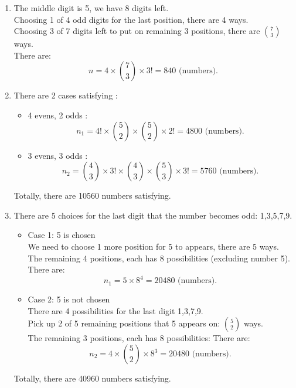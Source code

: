\documentclass[a4paper]{article}
\begin{document}
	\begin{enumerate}
	    \item The middle digit is 5, we have 8 digits left.\\
	    Choosing 1 of 4 odd digits for the last position, there are 4 ways. \\
	    Choosing 3 of 7 digits left to put on remaining 3 positions, there are $7\choose3$ ways. \\
	    There are:
	    \begin{equation*}
	        n = 4 \times {7 \choose 3} \times 3! =  840  \text{ (numbers). }
	    \end{equation*}
	    \item There are 2 cases satisfying :
	    \begin{itemize}
	        \item 4 evens, 2 odds :
	        \begin{equation*}
	           n_1 = 4! \times {5 \choose 2} \times {5 \choose 2} \times 2! = 4800 \text{ (numbers). }
 	        \end{equation*}
 	        \item 3 evens, 3 odds :
 	        \begin{equation*}
 	            n_2 = {4 \choose 3} \times 3! \times {4 \choose 3} \times {5 \choose 3} \times 3! = 5760 \text{ (numbers). }
 	        \end{equation*}
 	  
	    \end{itemize}
	    Totally, there are 10560 numbers satisfying.
	    \item There are 5 choices for the last digit that the number becomes odd: 1,3,5,7,9.
	    \begin{itemize}
	        \item Case 1: 5 is chosen \\
	        We need to choose 1 more position for 5 to appears, there are 5 ways. The remaining 4 positions, each has 8 possibilities (excluding number 5). 
	        There are:
	        \begin{equation*}
	            n_1 = 5 \times  8^{4} = 20480 \text{ (numbers). }
	        \end{equation*}
	        \item Case 2: 5 is not chosen \\
	        There are 4 possibilities for the last digit 1,3,7,9. \\
	        Pick up 2 of 5 remaining positions that 5 appears on: $ 5\choose 2$ ways.\\
	        The remaining 3 positions, each has 8 possibilities:
	        There are:
	        \begin{equation*}
	            n_2 = 4 \times {5 \choose 2} \times 8^{3} = 20480 \text{ (numbers). } 
	        \end{equation*}
	    \end{itemize}
	    Totally, there are 40960 numbers satisfying.
	\end{enumerate}
\end{document}
